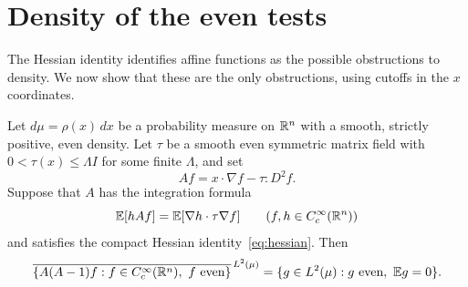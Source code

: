 \section{Density of the even tests}\label{sec:density}

The Hessian identity identifies affine functions as the possible
obstructions to density.  We now show that these are the only
obstructions, using cutoffs in the $x$ coordinates.

\begin{lemma}\label{lem:density}
Let $d\mu=\rho(x)\,dx$ be a probability measure on $\mathbb R^n$ with a smooth,
strictly positive, even density.  Let $\tau$ be a smooth even symmetric
matrix field with $0<\tau(x)\le\Lambda I$ for some finite $\Lambda$, and set
\[
 Af=x\cdot\nabla f-\tau:D^2f.
\]
Suppose that $A$ has the integration formula
\[
 \mathbb E[hAf]=\mathbb E[\nabla h\cdot\tau\nabla f]
 \qquad(f,h\in C_c^\infty(\mathbb R^n))
\]
and satisfies the compact Hessian identity~\eqref{eq:hessian}.
Then
\[
 \overline{\{A(A-1)f:f\in C_c^\infty(\R^n),\ f\text{ even}\}}^{\,L^2(\mu)}
 =\{g\in L^2(\mu):g\text{ even},\ \E g=0\}.
\]
\end{lemma}

